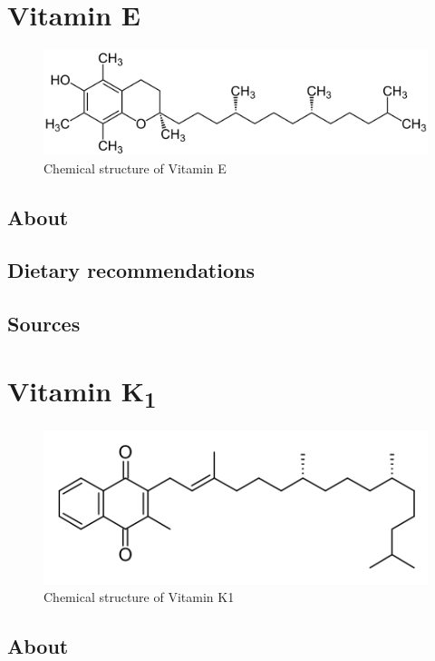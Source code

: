 \documentclass{book}
\begin{document}
\chapter{Vitamin E}
\begin{figure}[h]
	\caption{Chemical structure of Vitamin E}
	\centering \includegraphics[width=\textwidth]{images/Vitamin_E_chemical_structure}
\end{figure}
\newpage

\section{About}


\section{Dietary recommendations}


\section{Sources}


\chapter{Vitamin K\textsubscript{1}}
\begin{figure}[h]
	\caption{Chemical structure of Vitamin K1}
	\centering \includegraphics[width=\textwidth]{images/Vitamin_K1_chemical_structure}
\end{figure}
\newpage

\section{About}
\end{document}
